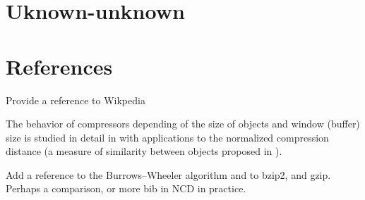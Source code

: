 %
%
\section{Uknown-unknown}



%
%
\section*{References}

{\color{red} Provide a reference to Wikpedia}

The behavior of compressors depending of the size of objects and window (buffer) size is studied in detail in \cite{cebrian2005common} with applications to the normalized compression distance (a measure of similarity between objects proposed in \cite{li2004similarity}).

Add a reference to the Burrows–Wheeler algorithm and to bzip2, and gzip. Perhaps a comparison, or more bib in NCD in practice.


